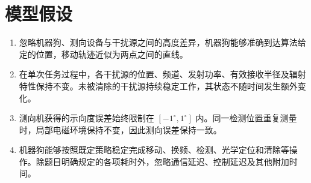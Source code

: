 \Needspace{55mm}
\section{模型假设}\label{sec:model-assumptions}

\begin{enumerate}
    \item 忽略机器狗、测向设备与干扰源之间的高度差异，机器狗能够准确到达算法给定的位置，移动轨迹近似为两点之间的直线。

    \item 在单次任务过程中，各干扰源的位置、频道、发射功率、有效接收半径及辐射特性保持不变。未被清除的干扰源持续稳定工作，其状态不随时间发生额外变化。

    \item 测向机获得的示向度误差始终限制在 $[-1^\circ,1^\circ]$ 内。同一检测位置重复测量时，局部电磁环境保持不变，因此测向误差保持一致。

    \item 机器狗能够按照既定策略稳定完成移动、换频、检测、光学定位和清除等操作。除题目明确规定的各项耗时外，忽略通信延迟、控制延迟及其他附加时间。
\end{enumerate}
